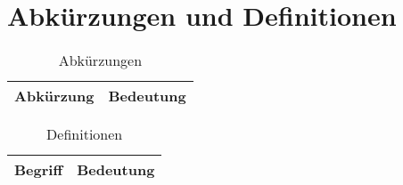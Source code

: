 
\section{Abkürzungen und Definitionen}\label{sec:abk_rzungen_}

\begin{table}[htpb]
  \centering
  \caption{Abkürzungen}
\label{tab:abkuerzungen}
\begin{tabularx}{\textwidth}{@{} l X @{}}
  \toprule
   Abkürzung & Bedeutung \\
  \midrule

  \bottomrule
  \end{tabularx}
\end{table}


\begin{table}[htpb]
  \centering
  \caption{Definitionen}
\label{tab:definitionen}
\begin{tabularx}{\textwidth}{@{} X X @{}}
  \toprule
   Begriff & Bedeutung \\
  \midrule

  \bottomrule
  \end{tabularx}
\end{table}


